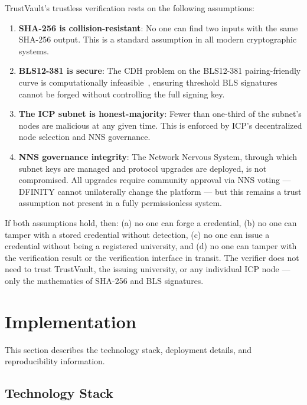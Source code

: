 \documentclass[journal]{IEEEtran}
\begin{document}
TrustVault's trustless verification rests on the following assumptions:
\begin{enumerate}
  \item \textbf{SHA-256 is collision-resistant}: No one can find two inputs with the same SHA-256 output. This is a standard assumption in all modern cryptographic systems.
  \item \textbf{BLS12-381 is secure}: The CDH problem on the BLS12-381 pairing-friendly curve is computationally infeasible~\cite{boneh2001bls}, ensuring threshold BLS signatures cannot be forged without controlling the full signing key.
  \item \textbf{The ICP subnet is honest-majority}: Fewer than one-third of the subnet's nodes are malicious at any given time. This is enforced by ICP's decentralized node selection and NNS governance.
  \item \textbf{NNS governance integrity}: The Network Nervous System, through which subnet keys are managed and protocol upgrades are deployed, is not compromised. All upgrades require community approval via NNS voting — DFINITY cannot unilaterally change the platform — but this remains a trust assumption not present in a fully permissionless system.
\end{enumerate}

If both assumptions hold, then: (a) no one can forge a credential, (b) no one can tamper with a stored credential without detection, (c) no one can issue a credential without being a registered university, and (d) no one can tamper with the verification result or the verification interface in transit. The verifier does not need to trust TrustVault, the issuing university, or any individual ICP node — only the mathematics of SHA-256 and BLS signatures.

\section{Implementation}
\label{sec:impl}

This section describes the technology stack, deployment details, and reproducibility information.

\subsection{Technology Stack}
\end{document}
